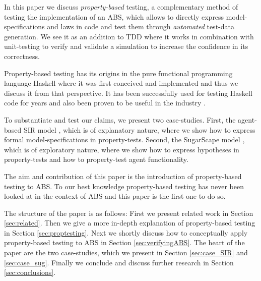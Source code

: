 
In this paper we discuss \textit{property-based} testing, a complementary method of testing the implementation of an ABS, which allows to directly express model-specifications and laws in code and test them through \textit{automated} test-data generation. We see it as an addition to TDD where it works in combination with unit-testing to verify and validate a simulation to increase the confidence in its correctness.

Property-based testing has its origins \cite{claessen_quickcheck_2000,claessen_testing_2002,runciman_smallcheck_2008} in the pure functional programming language Haskell \cite{hudak_history_2007} where it was first conceived and implemented and thus we discuss it from that perspective. It has been successfully used for testing Haskell code for years and also been proven to be useful in the industry \cite{hughes_quickcheck_2007}.

To substantiate and test our claims, we present two case-studies. First, the agent-based SIR model \cite{macal_agent-based_2010}, which is of explanatory nature, where we show how to express formal model-specifications in property-tests. Second, the SugarScape model \cite{epstein_growing_1996}, which is of exploratory nature, where we show how to express hypotheses in property-tests and how to property-test agent functionality. 

The aim and contribution of this paper is the introduction of property-based testing to ABS. To our best knowledge property-based testing has never been looked at in the context of ABS and this paper is the first one to do so.

The structure of the paper is as follows: First we present related work in Section \ref{sec:related}. Then we give a more in-depth explanation of property-based testing in Section \ref{sec:proptesting}. Next we shortly discuss how to conceptually apply property-based testing to ABS in Section \ref{sec:verifyingABS}. The heart of the paper are the two case-studies, which we present in Section \ref{sec:case_SIR} and \ref{sec:case_sug}. Finally we conclude and discuss further research in Section \ref{sec:conclusions}.
